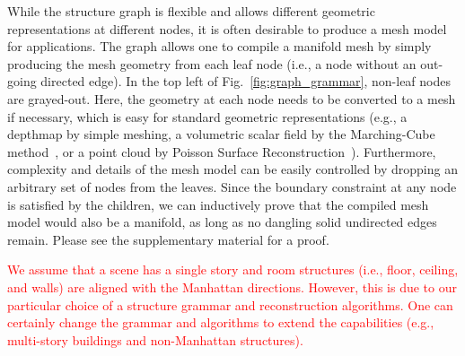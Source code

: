  While the structure graph is flexible
and allows different geometric representations at different nodes, it is
often desirable to produce a mesh model for applications.
The graph allows one to compile a manifold mesh by simply producing the
mesh geometry from each leaf node (i.e., a node without an out-going
directed edge). In the top left of Fig.~\ref{fig:graph_grammar},
non-leaf nodes are grayed-out. Here, the geometry at each node needs to
be converted to a mesh if necessary, which is easy for standard
geometric representations (e.g., a depthmap by simple meshing, a
volumetric scalar field by the Marching-Cube method~\cite{MarchingCube},
or a point cloud by Poisson Surface
Reconstruction~\cite{shan2014occluding}). Furthermore,
complexity and details of the mesh model can be easily controlled by dropping an arbitrary set of nodes from the
leaves. Since the boundary constraint at any node is satisfied by the
children, we can inductively prove that the compiled mesh model would
also be a manifold, as long as no dangling solid undirected edges
remain. Please see the supplementary material for a proof.


\mysubsubsection{\textcolor{red}{Assumptions}}
\textcolor{red}{We assume that a scene has a single story and room structures (i.e., floor, ceiling, and walls) are aligned with the Manhattan directions. However, this is due to our particular choice of a structure grammar and reconstruction algorithms. One can certainly change the grammar and algorithms to extend the capabilities (e.g., multi-story buildings and non-Manhattan structures).}



